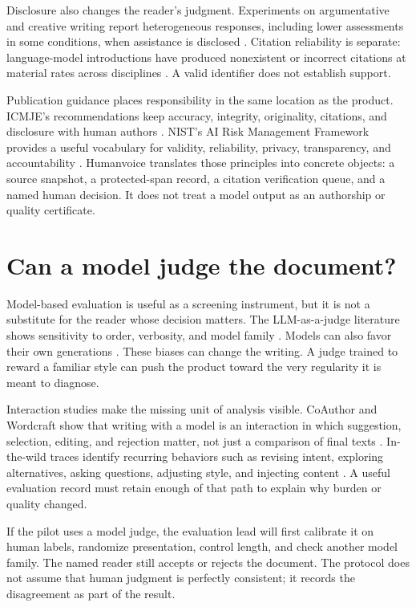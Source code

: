 Disclosure also changes the reader's judgment. Experiments on argumentative and
creative writing report heterogeneous responses, including lower assessments in
some conditions, when assistance is disclosed \citep{li2024disclosure}. Citation
reliability is separate: language-model introductions have produced nonexistent
or incorrect citations at material rates across disciplines
\citep{mugaanyi2024citation}. A valid identifier does not establish support.

Publication guidance places responsibility in the same location as the
product. ICMJE's recommendations keep accuracy, integrity, originality,
citations, and disclosure with human authors \citep{icmje2025ai}. NIST's AI
Risk Management Framework provides a useful vocabulary for validity,
reliability, privacy, transparency, and accountability \citep{nist2023airmf}.
Humanvoice translates those principles into concrete objects: a source
snapshot, a protected-span record, a citation verification queue, and a named
human decision. It does not treat a model output as an authorship or quality
certificate.

\section{Can a model judge the document?}

Model-based evaluation is useful as a screening instrument, but it is not a
substitute for the reader whose decision matters. The LLM-as-a-judge literature
shows sensitivity to order, verbosity, and model family
\citep{zheng2023judging,dubois2024length}. Models can also favor their own
generations \citep{panickssery2024llm}. These biases can change the writing. A
judge trained to reward a familiar style can push the product
toward the very regularity it is meant to diagnose.

Interaction studies make the missing unit of analysis visible. CoAuthor and
Wordcraft show that writing with a model is an interaction in which suggestion,
selection, editing, and rejection matter, not just a comparison of final texts
\citep{lee2022coauthor,yuan2022wordcraft}. In-the-wild traces identify
recurring behaviors such as revising intent, exploring alternatives, asking
questions, adjusting style, and injecting content \citep{mysore2025paths}. A
useful evaluation record must retain enough of that path to explain why burden
or quality changed.

If the pilot uses a model judge, the evaluation lead will first calibrate it on
human labels, randomize presentation, control length, and check another model
family. The named reader still accepts or rejects the document. The protocol
does not assume that human judgment is perfectly consistent; it records the
disagreement as part of the result.

